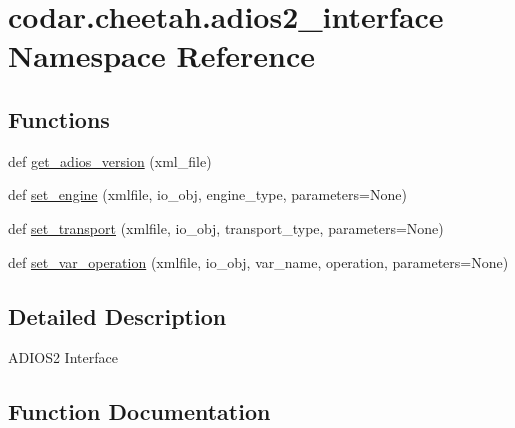 \hypertarget{namespacecodar_1_1cheetah_1_1adios2__interface}{}\section{codar.\+cheetah.\+adios2\+\_\+interface Namespace Reference}
\label{namespacecodar_1_1cheetah_1_1adios2__interface}
\subsection*{Functions}
\begin{DoxyCompactItemize}
\item 
def \hyperlink{namespacecodar_1_1cheetah_1_1adios2__interface_a0057fefc2ed99cf8b09ea20f3a8c213b}{get\+\_\+adios\+\_\+version} (xml\+\_\+file)
\item 
def \hyperlink{namespacecodar_1_1cheetah_1_1adios2__interface_ac7a185c06b845d8a964ef05d380d9406}{set\+\_\+engine} (xmlfile, io\+\_\+obj, engine\+\_\+type, parameters=None)
\item 
def \hyperlink{namespacecodar_1_1cheetah_1_1adios2__interface_a280110df154228afd07dcb5c5a4a72d4}{set\+\_\+transport} (xmlfile, io\+\_\+obj, transport\+\_\+type, parameters=None)
\item 
def \hyperlink{namespacecodar_1_1cheetah_1_1adios2__interface_a7bfeac0db728f4fcfd42c176d18e1a20}{set\+\_\+var\+\_\+operation} (xmlfile, io\+\_\+obj, var\+\_\+name, operation, parameters=None)
\end{DoxyCompactItemize}


\subsection{Detailed Description}
\begin{DoxyVerb}ADIOS2 Interface
\end{DoxyVerb}
 

\subsection{Function Documentation}
\mbox{\label{namespacecodar_1_1cheetah_1_1adios2__interface_a0057fefc2ed99cf8b09ea20f3a8c213b}} 
